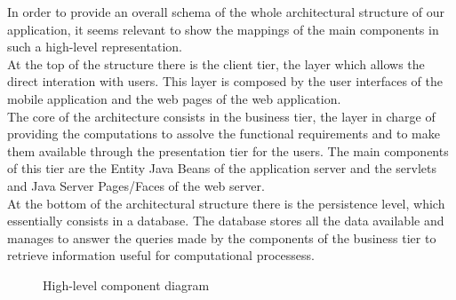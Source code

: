In order to provide an overall schema of the whole architectural structure of our application, it seems relevant to show the mappings of the main components in such a high-level representation. \\
At the top of the structure there is the client tier, the layer which allows the direct interation with users. This layer is composed by the user interfaces of the mobile application and the web pages of the web application. \\
The core of the architecture consists in the business tier, the layer in charge of providing the computations to assolve the functional requirements and to make them available through the presentation tier for the users. The main components of this tier are the Entity Java Beans of the application server and the servlets and Java Server Pages/Faces of the web server. \\
At the bottom of the architectural structure there is the persistence level, which essentially consists in a database. The database stores all the data available and manages to answer the queries made by the components of the business tier to retrieve information useful for computational processess.\\ 



\begin{figure} 
\begin{center}

\caption{High-level component diagram} 
\label{fig:hlcomponentdiagram} 


\end{center}
\end{figure} 
